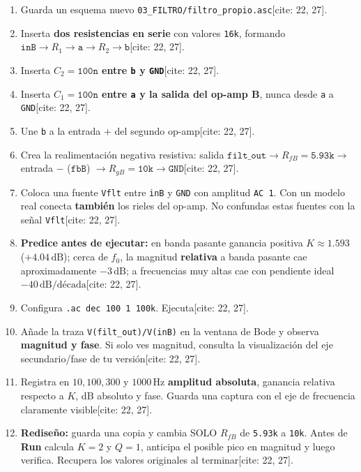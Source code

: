 \documentclass[10pt, a4paper]{article}
\begin{document}
\begin{enumerate}[noitemsep, leftmargin=*]
    \item Guarda un esquema nuevo \texttt{03\_FILTRO/filtro\_propio.asc}[cite: 22, 27].
    \item Inserta \textbf{dos resistencias en serie} con valores \texttt{16k}, formando $\texttt{inB} \to R_1 \to \texttt{a} \to R_2 \to \texttt{b}$[cite: 22, 27].
    \item Inserta \textbf{$C_2 = \texttt{100n}$ entre \texttt{b} y \texttt{GND}}[cite: 22, 27].
    \item Inserta \textbf{$C_1 = \texttt{100n}$ entre \texttt{a} y la salida del op-amp B}, nunca desde \texttt{a} a \texttt{GND}[cite: 22, 27].
    \item Une \texttt{b} a la entrada $+$ del segundo op-amp[cite: 22, 27].
    \item Crea la realimentación negativa resistiva: salida $\texttt{filt\_out} \to R_{fB}=\texttt{5.93k} \to$ entrada $-$ ($\texttt{fbB}$) $\to R_{gB}=\texttt{10k} \to \texttt{GND}$[cite: 22, 27].
    \item Coloca una fuente \texttt{Vflt} entre \texttt{inB} y \texttt{GND} con amplitud \texttt{AC 1}. Con un modelo real conecta \textbf{también} los rieles del op-amp. No confundas estas fuentes con la señal \texttt{Vflt}[cite: 22, 27].
    \item \textbf{Predice antes de ejecutar:} en banda pasante ganancia positiva $K \approx 1.593$ ($+4.04\,\text{dB}$); cerca de $f_0$, la magnitud \textbf{relativa} a banda pasante cae aproximadamente $-3\,\text{dB}$; a frecuencias muy altas cae con pendiente ideal $-40\,\text{dB/década}$[cite: 22, 27].
    \item Configura \texttt{.ac dec 100 1 100k}. Ejecuta[cite: 22, 27].
    \item Añade la traza \texttt{V(filt\_out)/V(inB)} en la ventana de Bode y observa \textbf{magnitud y fase}. Si solo ves magnitud, consulta la visualización del eje secundario/fase de tu versión[cite: 22, 27].
    \item Registra en $10, 100, 300$ y $1000\,\text{Hz}$ \textbf{amplitud absoluta}, ganancia relativa respecto a $K$, dB absoluto y fase. Guarda una captura con el eje de frecuencia claramente visible[cite: 22, 27].
    \item \textbf{Rediseño:} guarda una copia y cambia SOLO $R_{fB}$ de \texttt{5.93k} a \texttt{10k}. Antes de \textbf{Run} calcula $K = 2$ y $Q = 1$, anticipa el posible pico en magnitud y luego verifica. Recupera los valores originales al terminar[cite: 22, 27].
\end{enumerate}
\end{document}
